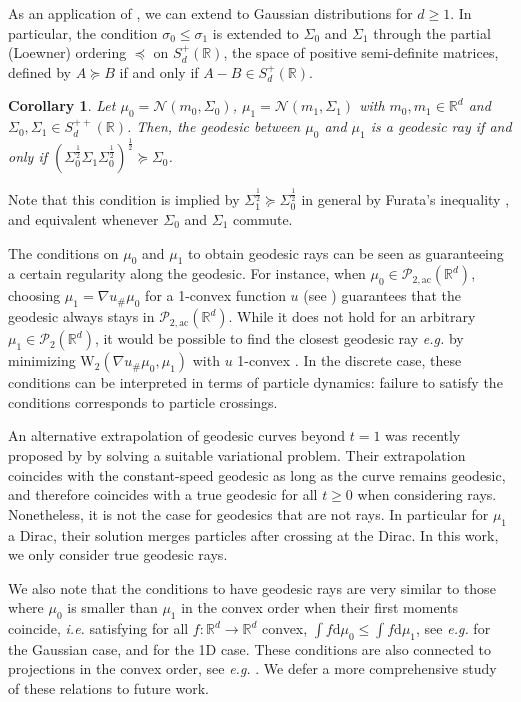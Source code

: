 \documentclass[twoside]{article}
\newtheorem{corollary}{Corollary}
\newcommand{\cP}{\mathcal{P}}
\newcommand{\cPa}{\mathcal{P}_{2,\mathrm{ac}}(\R^d)}
\newcommand{\cN}{\mathcal{N}}
\newcommand{\W}{\mathrm{W}}
\newcommand{\R}{\mathbb{R}}
\begin{document}
 As an application of , we can extend  to Gaussian distributions for $d\geq1$. In particular, the condition $\sigma_0\le \sigma_1$ is extended to $\Sigma_0$ and $\Sigma_1$ through the partial (Loewner) ordering $\preceq$ on $S_d^{+}(\R)$, the space of positive semi-definite matrices, defined by $A\succeq B$ if and only if $A-B\in S_d^{+}(\R)$.
\begin{corollary} \label{corr:gaussian_geod}
    Let $\mu_0=\cN(m_0,\Sigma_0)$, $\mu_1=\cN(m_1,\Sigma_1)$ with $m_0,m_1\in\R^d$ and $\Sigma_0,\Sigma_1\in S_d^{++}(\R)$. Then, the geodesic between $\mu_0$ and $\mu_1$ is a geodesic ray if and only if $(\Sigma_0^{\frac12}\Sigma_1\Sigma_0^{\frac12})^{\frac12}\succeq \Sigma_0$.
\end{corollary}
Note that this condition is implied by $\Sigma_1^{\frac12}\succeq \Sigma_0^{\frac12}$ in general by Furata's inequality \citep[Theorem 1.3]{fujii2010furuta}, and equivalent whenever $\Sigma_0$ and $\Sigma_1$ commute.





 The conditions on $\mu_0$ and $\mu_1$ to obtain geodesic rays can be seen as guaranteeing a certain regularity along the geodesic. For instance, when $\mu_0\in\cPa$, choosing $\mu_1=\nabla u_\#\mu_0$ for a 1-convex function $u$ (see )
guarantees that the geodesic always stays in $\cPa$. %
While it does not hold for an arbitrary $\mu_1\in\cP_2(\R^d)$, it would be possible to find the closest geodesic ray \emph{e.g.} by minimizing $\W_2(\nabla u_\#\mu_0,\mu_1)$ with $u$ 1-convex \citep{paty2020regularity}. In the discrete case, these conditions can be interpreted in terms of particle dynamics: failure to satisfy the conditions corresponds to particle crossings. 

An alternative extrapolation of geodesic curves beyond $t=1$ was recently proposed by \citet{gallouet2025metric} by solving a suitable variational problem. Their extrapolation coincides with the constant-speed geodesic as long as the curve remains geodesic, and therefore coincides with a true geodesic for all $t\ge 0$ when considering rays. Nonetheless, it is not the case for geodesics that are not rays. In particular for $\mu_1$ a Dirac, their solution merges particles after crossing at the Dirac. In this work, we only consider true geodesic rays.

We also note that the conditions to have geodesic rays are very similar to those where $\mu_0$ is smaller than $\mu_1$ in the convex order when their first moments coincide, \emph{i.e.} satisfying for all $f:\R^d\to\R^d$ convex, $\int f\mathrm{d}\mu_0 \le \int f\mathrm{d}\mu_1$, see \emph{e.g.} \citep[Theorem 4 and 6]{muller2001stochastic} for the Gaussian case, and \citep{shu2020hopf} for the 1D case. These conditions are also connected to projections in the convex order, see \emph{e.g.} \citep[Proposition 3.3]{alfonsi2025wasserstein}. We defer a more comprehensive study of these relations to future work.
\end{document}
